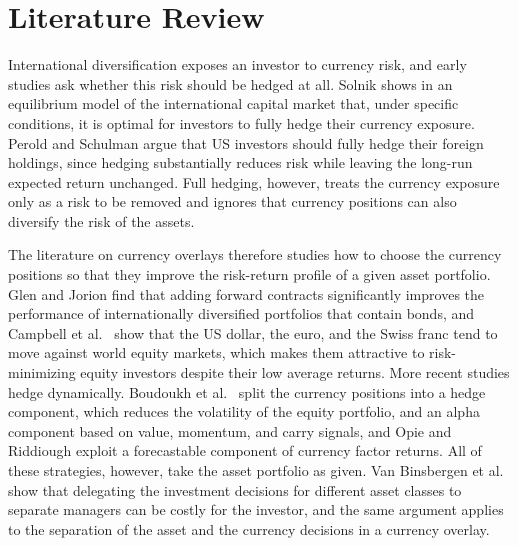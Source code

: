 \chapter{Literature Review}\label{chap:literature-review}

International diversification exposes an investor to currency risk, and early studies ask whether this risk should be
hedged at all. Solnik \cite{Solnik1974} shows in an equilibrium model of the international capital market that, under
specific conditions, it is optimal for investors to fully hedge their currency exposure. Perold and Schulman
\cite{PeroldSchulman1988} argue that US investors should fully hedge their foreign holdings, since hedging substantially
reduces risk while leaving the long-run expected return unchanged. Full hedging, however, treats the currency exposure
only as a risk to be removed and ignores that currency positions can also diversify the risk of the assets. 

The literature on currency overlays therefore studies how to choose the currency positions so that they improve the
risk-return profile of a given asset portfolio. Glen and Jorion \cite{GlenJorion1993} find that adding forward contracts
significantly improves the performance of internationally diversified portfolios that contain bonds, and Campbell et
al.~\cite{global_currency_hedging} show that the US dollar, the euro, and the Swiss franc tend to move against world
equity markets, which makes them attractive to risk-minimizing equity investors despite their low average returns.
More recent studies hedge dynamically. Boudoukh et al.~\cite{BoudoukhRichardsonThaparWang2019} split the currency
positions into a hedge component, which reduces the volatility of the equity portfolio, and an alpha component based on
value, momentum, and carry signals, and Opie and Riddiough \cite{OpieRiddiough2020} exploit a forecastable component of
currency factor returns. All of these strategies, however, take the asset portfolio as given. Van Binsbergen et
al.~\cite{VanBinsbergenBrandtKoijen2008} show that delegating the investment decisions for different asset classes to
separate managers can be costly for the investor, and the same argument applies to the separation of the asset and the
currency decisions in a currency overlay.

